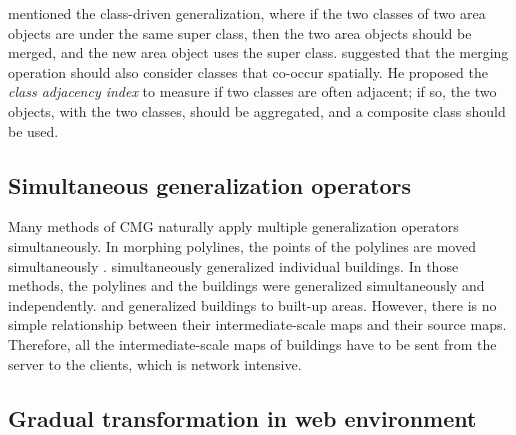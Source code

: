 \documentclass[twocolumn]{svjour3}          %
\begin{document}
 mentioned the class-driven generalization, 
where if the two classes of two area objects are under the same super class,
then the two area objects should be merged, 
and the new area object uses the super class.
 suggested that
the merging operation should also consider classes that co-occur spatially.
He proposed the \emph{class adjacency index} to measure 
if two classes are often adjacent;
if so, the two objects, with the two classes, should be aggregated,
and a composite class should be used.



\subsection{Simultaneous generalization operators}


Many methods of CMG naturally apply multiple generalization operators simultaneously.
In morphing polylines, the points of the polylines are moved simultaneously
\citep[\eg][]{Noellenburg2008,Li2017Annealing}.
\citet{Li2017_Building} simultaneously generalized individual buildings.
In those methods, the polylines and the buildings 
were generalized simultaneously and independently.
\citet{Peng2017Building} and \citet{Touya2017Progressive}
generalized buildings to built-up areas.
However, there is no simple relationship 
between their intermediate-scale maps and their source maps.
Therefore, all the intermediate-scale maps of buildings have to be
sent from the server to the clients,
which is network intensive.



\subsection{Gradual transformation in web environment}
\end{document}
